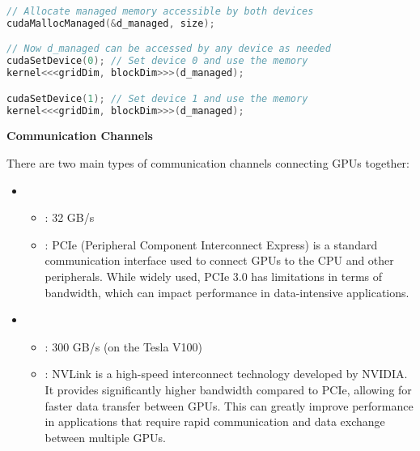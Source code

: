 \begin{itemize}
\begin{examplebox}
\begin{lstlisting}[language=C++]
// Allocate managed memory accessible by both devices
cudaMallocManaged(&d_managed, size);

// Now d_managed can be accessed by any device as needed
cudaSetDevice(0); // Set device 0 and use the memory
kernel<<<gridDim, blockDim>>>(d_managed);

cudaSetDevice(1); // Set device 1 and use the memory
kernel<<<gridDim, blockDim>>>(d_managed);\end{lstlisting}
  \end{examplebox}
\end{itemize}

\newpage

\begin{flushleft}
  \textcolor{Green3}{ \textbf{Communication Channels}}
\end{flushleft}
There are two main types of communication channels connecting GPUs together:
\begin{itemize}
  \item {}
  \begin{itemize}
    \item {}: 32 GB/s
    \item {}: PCIe (Peripheral Component Interconnect Express) is a standard communication interface used to connect GPUs to the CPU and other peripherals. While widely used, PCIe 3.0 has limitations in terms of bandwidth, which can impact performance in data-intensive applications.
  \end{itemize}

  \item {}
  \begin{itemize}
    \item {}: 300 GB/s (on the Tesla V100)
    \item {}: NVLink is a high-speed interconnect technology developed by NVIDIA. It provides significantly higher bandwidth compared to PCIe, allowing for faster data transfer between GPUs. This can greatly improve performance in applications that require rapid communication and data exchange between multiple GPUs.
  \end{itemize}
\end{itemize}